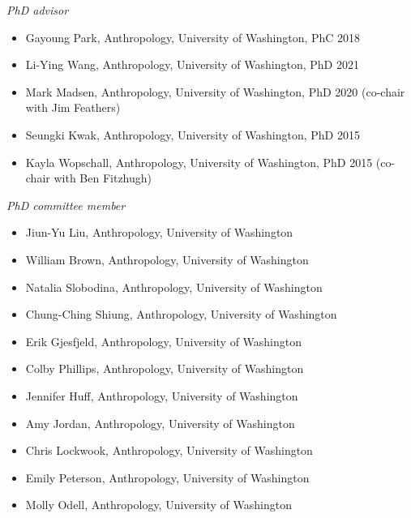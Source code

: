 \medskip

\medskip

\noindent\emph{PhD advisor\vspace{0.01in}}

\medskip

\begin{itemize}[noitemsep, font=$\bullet$\scshape\bfseries]

\item Gayoung Park, Anthropology, University of Washington, PhC 2018

\item Li-Ying Wang, Anthropology, University of Washington, PhD 2021

\item Mark Madsen, Anthropology, University of Washington, PhD 2020 (co-chair with Jim Feathers)

\item Seungki Kwak, Anthropology, University of Washington, PhD 2015

\item Kayla Wopschall, Anthropology, University of Washington, PhD 2015 (co-chair with Ben Fitzhugh)

\end{itemize}

\medskip

\noindent\emph{PhD committee member\vspace{0.01in}}

\medskip

\begin{itemize}[noitemsep, font=$\bullet$\scshape\bfseries]

\item Jiun-Yu Liu, Anthropology, University of Washington

\item William Brown, Anthropology, University of Washington

\item Natalia Slobodina, Anthropology, University of Washington

\item Chung-Ching Shiung, Anthropology, University of Washington

\item Erik Gjesfjeld, Anthropology, University of Washington

\item Colby Phillips, Anthropology, University of Washington

\item Jennifer Huff, Anthropology, University of Washington

\item Amy Jordan, Anthropology, University of Washington

\item Chris Lockwook, Anthropology, University of Washington

\item Emily Peterson, Anthropology, University of Washington

\item Molly Odell, Anthropology, University of Washington

\end{itemize}

